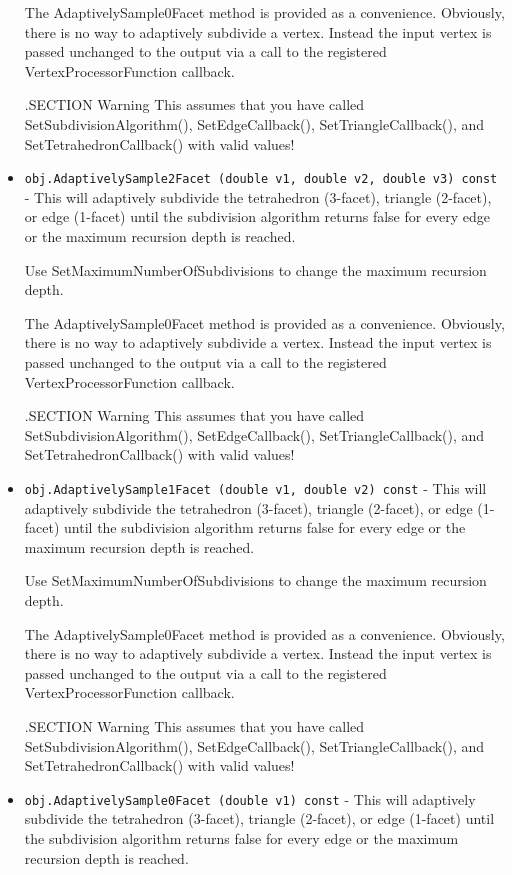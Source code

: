 \begin{itemize}
 The AdaptivelySample0Facet method is provided as a convenience.
 Obviously, there is no way to adaptively subdivide a vertex.
 Instead the input vertex is passed unchanged to the output
 via a call to the registered VertexProcessorFunction callback.

 .SECTION Warning
 This assumes that you have called SetSubdivisionAlgorithm(),
 SetEdgeCallback(), SetTriangleCallback(), and SetTetrahedronCallback()
 with valid values!

\item  \verb|obj.AdaptivelySample2Facet (double v1, double v2, double v3) const| -  This will adaptively subdivide the tetrahedron (3-facet),
 triangle (2-facet), or edge (1-facet) until the subdivision
 algorithm returns false for every edge or the maximum recursion
 depth is reached.

 Use  SetMaximumNumberOfSubdivisions to change the maximum
 recursion depth.

 The AdaptivelySample0Facet method is provided as a convenience.
 Obviously, there is no way to adaptively subdivide a vertex.
 Instead the input vertex is passed unchanged to the output
 via a call to the registered VertexProcessorFunction callback.

 .SECTION Warning
 This assumes that you have called SetSubdivisionAlgorithm(),
 SetEdgeCallback(), SetTriangleCallback(), and SetTetrahedronCallback()
 with valid values!

\item  \verb|obj.AdaptivelySample1Facet (double v1, double v2) const| -  This will adaptively subdivide the tetrahedron (3-facet),
 triangle (2-facet), or edge (1-facet) until the subdivision
 algorithm returns false for every edge or the maximum recursion
 depth is reached.

 Use  SetMaximumNumberOfSubdivisions to change the maximum
 recursion depth.

 The AdaptivelySample0Facet method is provided as a convenience.
 Obviously, there is no way to adaptively subdivide a vertex.
 Instead the input vertex is passed unchanged to the output
 via a call to the registered VertexProcessorFunction callback.

 .SECTION Warning
 This assumes that you have called SetSubdivisionAlgorithm(),
 SetEdgeCallback(), SetTriangleCallback(), and SetTetrahedronCallback()
 with valid values!

\item  \verb|obj.AdaptivelySample0Facet (double v1) const| -  This will adaptively subdivide the tetrahedron (3-facet),
 triangle (2-facet), or edge (1-facet) until the subdivision
 algorithm returns false for every edge or the maximum recursion
 depth is reached.


\end{itemize}
